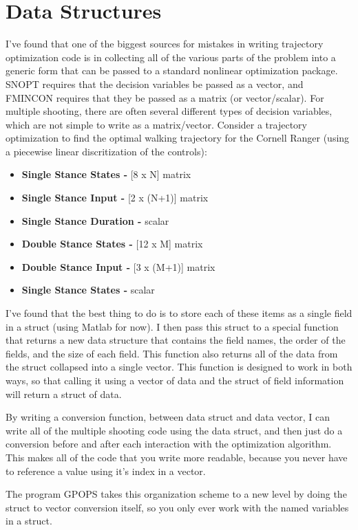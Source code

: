 \section{Data Structures}

I've found that one of the biggest sources for mistakes in writing trajectory optimization code is in collecting all of the various parts of the problem into a generic form that can be passed to a standard nonlinear optimization package. SNOPT requires that the decision variables be passed as a vector, and FMINCON requires that they be passed as a matrix (or vector/scalar). For multiple shooting, there are often several different types of decision variables, which are not simple to write as a matrix/vector. Consider a trajectory optimization to find the optimal walking trajectory for the Cornell Ranger (using a piecewise linear discritization of the controls):

\begin{itemize} \setlength{\itemsep}{0pt}

	\item{\bf Single Stance States - } [8 x N] matrix
	\item{\bf Single Stance Input - } [2 x (N+1)] matrix
	\item{\bf Single Stance Duration - } scalar
	\item{\bf Double Stance States - } [12 x M] matrix
	\item{\bf Double Stance Input - } [3 x (M+1)] matrix
	\item{\bf Single Stance States - } scalar

\end{itemize}

I've found that the best thing to do is to store each of these items as a single field in a struct (using Matlab for now). I then pass this struct to a special function that returns a new data structure that contains the field names, the order of the fields, and the size of each field. This function also returns all of the data from the struct collapsed into a single vector. This function is designed to work in both ways, so that calling it using a vector of data and the struct of field information will return a struct of data.

\par By writing a conversion function, between data struct and data vector, I can write all of the multiple shooting code using the data struct, and then just do a conversion before and after each interaction with the optimization algorithm. This makes all of the code that you write more readable, because you never have to reference a value using it's index in a vector. 

\par The program GPOPS takes this organization scheme to a new level by doing the struct to vector conversion itself, so you only ever work with the named variables in a struct.
